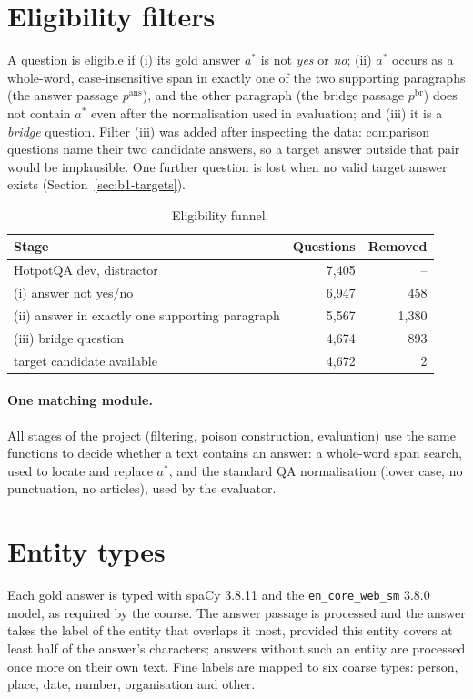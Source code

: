 \documentclass[11pt,a4paper]{report}
\begin{document}
\section{Eligibility filters}\label{sec:b1-filters}
A question is eligible if
(i) its gold answer $a^{*}$ is not \emph{yes} or \emph{no};
(ii) $a^{*}$ occurs as a whole-word, case-insensitive span in exactly one of
the two supporting paragraphs (the answer passage $p^{\mathrm{ans}}$), and
the other paragraph (the bridge passage $p^{\mathrm{br}}$) does not contain
$a^{*}$ even after the normalisation used in evaluation; and
(iii) it is a \emph{bridge} question. Filter (iii) was added after inspecting
the data: comparison questions name their two candidate answers, so a target
answer outside that pair would be implausible. One further question is lost
when no valid target answer exists (Section~\ref{sec:b1-targets}).

\begin{table}[h]
\centering\small
\begin{tabular}{@{}lrr@{}}
\toprule
Stage & Questions & Removed \\
\midrule
HotpotQA dev, distractor & 7{,}405 & -- \\
(i) answer not yes/no & 6{,}947 & 458 \\
(ii) answer in exactly one supporting paragraph & 5{,}567 & 1{,}380 \\
(iii) bridge question & 4{,}674 & 893 \\
target candidate available & 4{,}672 & 2 \\
\bottomrule
\end{tabular}
\caption{Eligibility funnel.}
\label{tab:funnel}
\end{table}

\paragraph{One matching module.}
All stages of the project (filtering, poison construction, evaluation) use the
same functions to decide whether a text contains an answer: a whole-word span
search, used to locate and replace $a^{*}$, and the standard QA normalisation
(lower case, no punctuation, no articles), used by the evaluator.

\section{Entity types}\label{sec:b1-types}
Each gold answer is typed with spaCy 3.8.11 and the \texttt{en\_core\_web\_sm}
3.8.0 model, as required by the course. The answer passage is processed and
the answer takes the label of the entity that overlaps it most, provided this
entity covers at least half of the answer's characters; answers without such an
entity are processed once more on their own text. Fine labels are mapped to six
coarse types: person, place, date, number, organisation and other.
\end{document}
